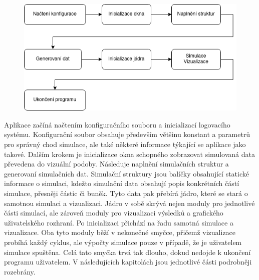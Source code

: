 \begin{figure}[hbt]
	\centering
	\captionsetup{justification=centering}
	\includegraphics[scale=0.6]{obrazky-figures/Simple.png}
	\label{fig:simpleStruct}
\end{figure}

Aplikace začíná načtením konfiguračního souboru a inicializací logovacího systému. Konfigurační soubor obsahuje především většinu konstant a parametrů pro správný chod simulace, ale také některé informace týkající se aplikace jako takové. Dalším krokem je inicializace okna schopného zobrazovat simulovaná data převedena do vizuální podoby. Následuje naplnění simulačních struktur a generovaní simulačních dat. Simulační struktury jsou balíčky obsahující statické informace o simulaci, kdežto simulační data obsahují popis konkrétních částí simulace, přesněji částic či buněk. Tyto data pak přebírá jádro, které se stará o samotnou simulaci a vizualizaci. Jádro v sobě skrývá nejen moduly pro jednotlivé části simulací, ale zároveň moduly pro vizualizaci výsledků a grafického uživatelského rozhraní. Po inicializaci přichází na řadu samotná simulace a vizualizace. Oba tyto moduly běží v nekonečné smyčce, přičemž vizualizace probíhá každý cyklus, ale výpočty simulace pouze v případě, že je uživatelem simulace spuštěna. Celá tato smyčka trvá tak dlouho, dokud nedojde k ukončení programu uživatelem. V následujících kapitolách jsou jednotlivé části podrobněji rozebrány. 

